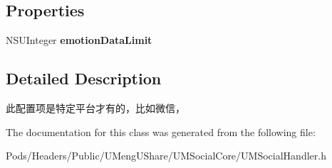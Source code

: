 \subsection*{Properties}
\begin{DoxyCompactItemize}
\item 
\mbox{\label{interface_u_m_social_share_emotion_object_config_ad64151eac1e8dec3c54413ed90185bee}} 
N\+S\+U\+Integer {\bfseries emotion\+Data\+Limit}
\end{DoxyCompactItemize}


\subsection{Detailed Description}
此配置项是特定平台才有的，比如微信， 

The documentation for this class was generated from the following file\+:\begin{DoxyCompactItemize}
\item 
Pods/\+Headers/\+Public/\+U\+Meng\+U\+Share/\+U\+M\+Social\+Core/U\+M\+Social\+Handler.\+h\end{DoxyCompactItemize}
